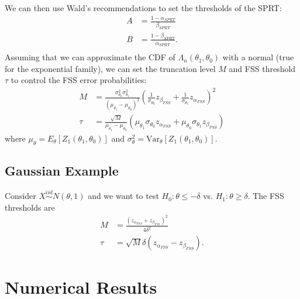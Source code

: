 \documentclass[11pt]{article}
\begin{document}
We can then use Wald's recommendations to set the thresholds of the SPRT:
\begin{equation}
\begin{split}
A &= \frac{1 - \alpha_{SPRT}}{\beta_{SPRT}} \\
B &= \frac{1 - \beta_{SPRT}}{\alpha_{SPRT}}. \\
\end{split}
\end{equation}
Assuming that we can approximate the CDF of $\Lambda_n(\theta_1, \theta_0)$ with a normal (true for the exponential family), we can set the truncation level $M$ and FSS threshold $\tau$ to control the FSS error probabilities:
\begin{equation}
\begin{split}
M &= \frac{\sigma_{\theta_0}^2 \sigma_{\theta_1}^2}{(\mu_{\theta_1} - \mu_{\theta_0})^2} \left(\frac{1}{\sigma_{\theta_0}} z_{\beta_{FSS}} + \frac{1}{\sigma_{\theta_1}}z_{\alpha_{FSS}}\right)^2 \\
\tau &= \frac{\sqrt{M}}{\mu_{\theta_1} - \mu_{\theta_0}} \left(\mu_{\theta_1} \sigma_{\theta_0} z_{\alpha_{FSS}} + \mu_{\theta_0} \sigma_{\theta_1} z_{\beta_{FSS}}\right)
\end{split}
\end{equation}
where $\mu_{\theta} = E_{\theta}\left[Z_1(\theta_1, \theta_0)\right]$ and $\sigma^2_{\theta} = \text{Var}_{\theta}\left[Z_1(\theta_1, \theta_0)\right]$.

\subsection{Gaussian Example}
Consider $X \overset{iid}\sim N(\theta, 1)$ and we want to test $H_0 : \theta \leq -\delta$ vs. $H_1 : \theta \geq \delta$. The FSS thresholds are
\begin{equation}
\begin{split}
M &= \frac{(z_{\alpha_{FSS}} + z_{\beta_{FSS}})^2}{4 \delta^2} \\
\tau &= \sqrt{M} \delta (z_{\alpha_{FSS}} - z_{\beta_{FSS}}).
\end{split}
\end{equation}

\section{Numerical Results}
\end{document}
